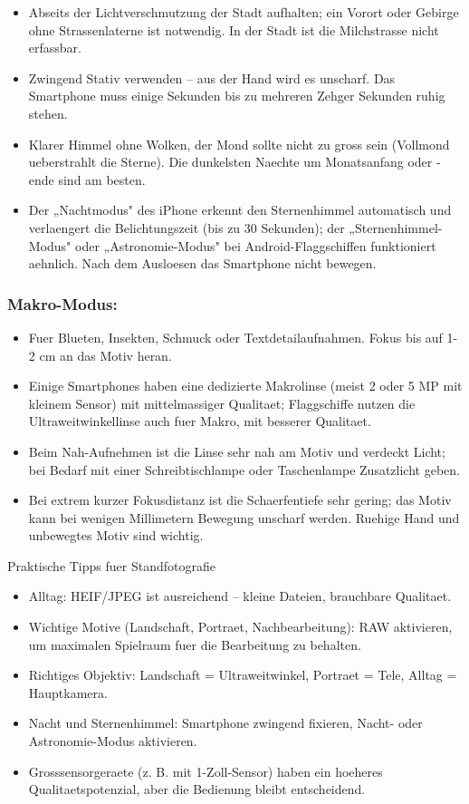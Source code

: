 \begin{itemize}
  \item Abseits der Lichtverschmutzung der Stadt aufhalten; ein Vorort oder Gebirge ohne Strassenlaterne ist notwendig. In der Stadt ist die Milchstrasse nicht erfassbar.
  \item Zwingend Stativ verwenden – aus der Hand wird es unscharf. Das Smartphone muss einige Sekunden bis zu mehreren Zehger Sekunden ruhig stehen.
  \item Klarer Himmel ohne Wolken, der Mond sollte nicht zu gross sein (Vollmond ueberstrahlt die Sterne). Die dunkelsten Naechte um Monatsanfang oder -ende sind am besten.
  \item Der „Nachtmodus" des iPhone erkennt den Sternenhimmel automatisch und verlaengert die Belichtungszeit (bis zu 30 Sekunden); der „Sternenhimmel-Modus" oder „Astronomie-Modus" bei Android-Flaggschiffen funktioniert aehnlich. Nach dem Ausloesen das Smartphone nicht bewegen.
\end{itemize}

\subsubsection*{Makro-Modus:}

\begin{itemize}
  \item Fuer Blueten, Insekten, Schmuck oder Textdetailaufnahmen. Fokus bis auf 1-2 cm an das Motiv heran.
  \item Einige Smartphones haben eine dedizierte Makrolinse (meist 2 oder 5 MP mit kleinem Sensor) mit mittelmassiger Qualitaet; Flaggschiffe nutzen die Ultraweitwinkellinse auch fuer Makro, mit besserer Qualitaet.
  \item Beim Nah-Aufnehmen ist die Linse sehr nah am Motiv und verdeckt Licht; bei Bedarf mit einer Schreibtischlampe oder Taschenlampe Zusatzlicht geben.
  \item Bei extrem kurzer Fokusdistanz ist die Schaerfentiefe sehr gering; das Motiv kann bei wenigen Millimetern Bewegung unscharf werden. Ruehige Hand und unbewegtes Motiv sind wichtig.
\end{itemize}

\begin{tcbinfo}{Praktische Tipps fuer Standfotografie}
\begin{itemize}
  \item Alltag: HEIF/JPEG ist ausreichend – kleine Dateien, brauchbare Qualitaet.
  \item Wichtige Motive (Landschaft, Portraet, Nachbearbeitung): RAW aktivieren, um maximalen Spielraum fuer die Bearbeitung zu behalten.
  \item Richtiges Objektiv: Landschaft = Ultraweitwinkel, Portraet = Tele, Alltag = Hauptkamera.
  \item Nacht und Sternenhimmel: Smartphone zwingend fixieren, Nacht- oder Astronomie-Modus aktivieren.
  \item Grosssensorgeraete (z. B. mit 1-Zoll-Sensor) haben ein hoeheres Qualitaetspotenzial, aber die Bedienung bleibt entscheidend.
\end{itemize}

\end{tcbinfo}

